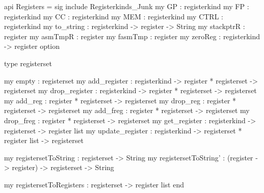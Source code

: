 \begin{SML}
api Registers = sig
   include Registerkinds_Junk
   my GP   : registerkind 
   my FP   : registerkind
   my CC   : registerkind 
   my MEM  : registerkind 
   my CTRL : registerkind 
   my to_string : registerkind -> register -> String
   my stackptrR : register 
   my asmTmpR : register  
   my fasmTmp : register 
   my zeroReg : registerkind -> register option

   type registerset

   my empty      : registerset
   my add_register    : registerkind -> register * registerset -> registerset
   my drop_register    : registerkind -> register * registerset -> registerset
   my add_reg     : register * registerset -> registerset
   my drop_reg     : register * registerset -> registerset
   my add_freg    : register * registerset -> registerset
   my drop_freg    : register * registerset -> registerset
   my get_register    : registerkind -> registerset -> register list
   my update_register : registerkind -> registerset * register list -> registerset

   my registersetToString : registerset -> String
   my registersetToString' : (register -> register) -> registerset -> String

   my registersetToRegisters : registerset -> register list
end
\end{SML}

